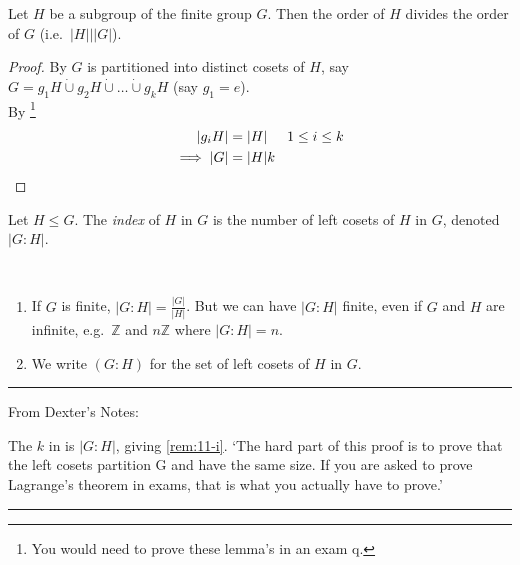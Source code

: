 \begin{theorem}
\protect\hypertarget{thm:three}{}\label{thm:three}
Let $H$ be a subgroup of the finite group $G$.
Then the order of $H$ divides the order of $G$ (i.e.~$|H| \mathbin{\bigg|} |G|$).
\end{theorem}

\begin{proof}
By  $G$ is partitioned into distinct cosets of $H$, say $G = g_1 H \mathbin{\dot{\cup}} g_2 H \mathbin{\dot{\cup}} \dots \mathbin{\dot{\cup}} g_k H$ (say $g_1 = e$).\\
By \footnote{You would need to prove these lemma's in an exam q.}
\begin{align*}
    |g_i H| &= |H| \hspace{.5cm} 1 \leq i \leq k \\
    \implies |G| &= |H|k
\end{align*}
\end{proof}

\begin{definition}
\protect\hypertarget{def:fourteen}{}\label{def:fourteen}
Let $H \leq G$.
The \emph{index} of $H$ in $G$ is the number of left cosets of $H$ in $G$, denoted $|G : H|$.
\end{definition}

\begin{remark} ~
    \begin{enumerate}
    \def\labelenumi{\roman{enumi}.}
    \item
    If $G$ is finite, $|G : H| = \frac{|G|}{|H|}$.
    But we can have $|G : H|$ finite, even if $G$ and $H$ are infinite, e.g.~$\mathbb{Z}$ and $n\mathbb{Z}$ where $|G : H| = n$. \label{rem:11-i}
    \item
    We write $(G : H)$ for the set of left cosets of $H$ in $G$.
    \end{enumerate}
\end{remark}

\begin{center}\rule{\linewidth}{0.5pt}\end{center}
From Dexter's Notes:

The $k$ in  is $| G : H |$, giving \cref{rem:11-i}.
`The hard part of this proof is to prove that the left cosets partition G
and have the same size.
If you are asked to prove Lagrange’s theorem in exams,
that is what you actually have to prove.'
\begin{center}\rule{\linewidth}{0.5pt}\end{center}

